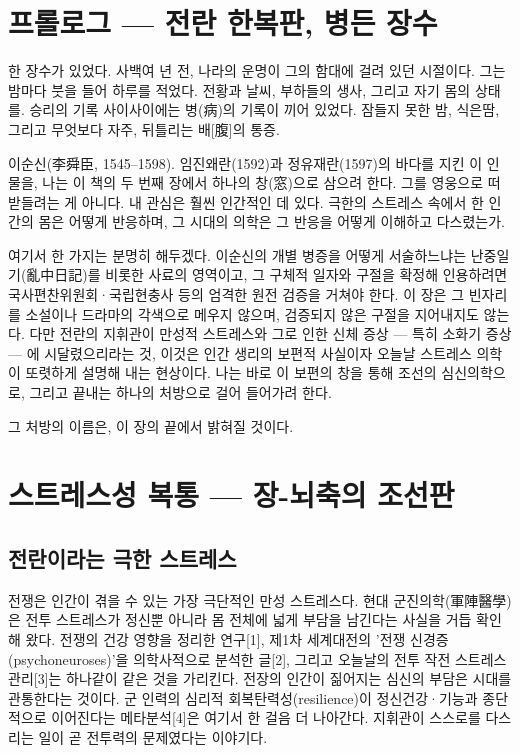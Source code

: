 \documentclass[12pt,oneside]{book}
\begin{document}
\section{프롤로그 — 전란 한복판, 병든 장수}

한 장수가 있었다. 사백여 년 전, 나라의 운명이 그의 함대에 걸려 있던 시절이다. 그는 밤마다 붓을 들어 하루를 적었다. 전황과 날씨, 부하들의 생사, 그리고 자기 몸의 상태를. 승리의 기록 사이사이에는 병(病)의 기록이 끼어 있었다. 잠들지 못한 밤, 식은땀, 그리고 무엇보다 자주, 뒤틀리는 배[腹]의 통증.

이순신(李舜臣, 1545–1598). 임진왜란(1592)과 정유재란(1597)의 바다를 지킨 이 인물을, 나는 이 책의 두 번째 장에서 하나의 창(窓)으로 삼으려 한다. 그를 영웅으로 떠받들려는 게 아니다. 내 관심은 훨씬 인간적인 데 있다. 극한의 스트레스 속에서 한 인간의 몸은 어떻게 반응하며, 그 시대의 의학은 그 반응을 어떻게 이해하고 다스렸는가.

여기서 한 가지는 분명히 해두겠다. 이순신의 개별 병증을 어떻게 서술하느냐는 난중일기(亂中日記)를 비롯한 사료의 영역이고, 그 구체적 일자와 구절을 확정해 인용하려면 국사편찬위원회·국립현충사 등의 엄격한 원전 검증을 거쳐야 한다. 이 장은 그 빈자리를 소설이나 드라마의 각색으로 메우지 않으며, 검증되지 않은 구절을 지어내지도 않는다. 다만 전란의 지휘관이 만성적 스트레스와 그로 인한 신체 증상 — 특히 소화기 증상 — 에 시달렸으리라는 것, 이것은 인간 생리의 보편적 사실이자 오늘날 스트레스 의학이 또렷하게 설명해 내는 현상이다. 나는 바로 이 보편의 창을 통해 조선의 심신의학으로, 그리고 끝내는 하나의 처방으로 걸어 들어가려 한다.

그 처방의 이름은, 이 장의 끝에서 밝혀질 것이다.

\section{스트레스성 복통 — 장-뇌축의 조선판}

\subsection{전란이라는 극한 스트레스}

전쟁은 인간이 겪을 수 있는 가장 극단적인 만성 스트레스다. 현대 군진의학(軍陣醫學)은 전투 스트레스가 정신뿐 아니라 몸 전체에 넓게 부담을 남긴다는 사실을 거듭 확인해 왔다. 전쟁의 건강 영향을 정리한 연구[1], 제1차 세계대전의 '전쟁 신경증(psychoneuroses)'을 의학사적으로 분석한 글[2], 그리고 오늘날의 전투 작전 스트레스 관리[3]는 하나같이 같은 것을 가리킨다. 전장의 인간이 짊어지는 심신의 부담은 시대를 관통한다는 것이다. 군 인력의 심리적 회복탄력성(resilience)이 정신건강·기능과 종단적으로 이어진다는 메타분석[4]은 여기서 한 걸음 더 나아간다. 지휘관이 스스로를 다스리는 일이 곧 전투력의 문제였다는 이야기다.
\end{document}
